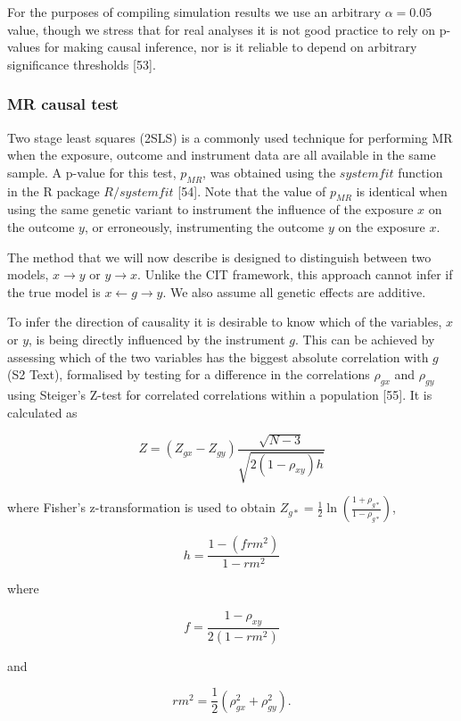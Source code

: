 \documentclass[]{article}
\begin{document}
For the purposes of compiling simulation results we use an arbitrary
\(\alpha = 0.05\) value, though we stress that for real analyses it is
not good practice to rely on p-values for making causal inference, nor
is it reliable to depend on arbitrary significance thresholds {[}53{]}.

\hypertarget{mr-causal-test}{%
\subsubsection{MR causal test}\label{mr-causal-test}}

Two stage least squares (2SLS) is a commonly used technique for
performing MR when the exposure, outcome and instrument data are all
available in the same sample. A p-value for this test, \(p_{MR}\), was
obtained using the \(systemfit\) function in the R package
\(R/systemfit\) {[}54{]}. Note that the value of \(p_{MR}\) is identical
when using the same genetic variant to instrument the influence of the
exposure \(x\) on the outcome \(y\), or erroneously, instrumenting the
outcome \(y\) on the exposure \(x\).

The method that we will now describe is designed to distinguish between
two models, \(x \rightarrow y\) or \(y \rightarrow x\). Unlike the CIT
framework, this approach cannot infer if the true model is
\(x \leftarrow g \rightarrow y\). We also assume all genetic effects are
additive.

To infer the direction of causality it is desirable to know which of the
variables, \(x\) or \(y\), is being directly influenced by the
instrument \(g\). This can be achieved by assessing which of the two
variables has the biggest absolute correlation with \(g\) (S2 Text),
formalised by testing for a difference in the correlations \(\rho_{gx}\)
and \(\rho_{gy}\) using Steiger's Z-test for correlated correlations
within a population {[}55{]}. It is calculated as

\[
Z = (Z_{gx} - Z_{gy}) \frac{\sqrt{N-3}}{\sqrt{2(1-\rho_{xy})h}}
\]

where Fisher's z-transformation is used to obtain
\(Z_{g*} = \frac{1}{2} \ln \left ( \frac{1+\rho_{g*}}{1-\rho_{g*}} \right )\),

\[
h = \frac{1 - (frm^2)} {1 - rm^2}
\]

where

\[
f = \frac{1 - \rho_{xy}}{2(1 - rm^2)}
\]

and

\[
rm^2 = \frac{1}{2}(\rho_{gx}^2 + \rho_{gy}^2).
\]
\end{document}
